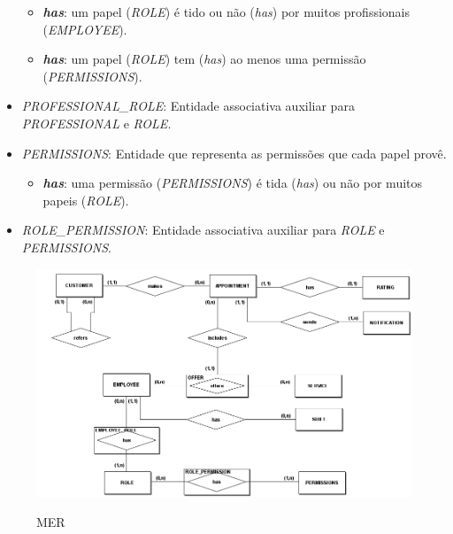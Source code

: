 \begin{itemize}
	\begin{itemize}
		\item \textbf{\textit{has}}: um papel (\emph{ROLE}) é tido ou não (\textit{has}) por muitos profissionais (\emph{EMPLOYEE}).
		\item \textbf{\textit{has}}: um papel (\emph{ROLE}) tem (\textit{has}) ao menos uma permissão (\emph{PERMISSIONS}).
	\end{itemize}
	\item \emph{PROFESSIONAL\_ROLE}: Entidade associativa auxiliar para \emph{PROFESSIONAL} e \emph{ROLE}.
	\item \emph{PERMISSIONS}: Entidade que representa as permissões que cada papel provê.
	\begin{itemize}
		\item \textbf{\textit{has}}: uma permissão (\emph{PERMISSIONS}) é tida (\textit{has}) ou não por muitos papeis (\emph{ROLE}).
\end{itemize}
	\item \emph{ROLE\_PERMISSION}: Entidade associativa auxiliar para \emph{ROLE} e \emph{PERMISSIONS}.
\end{itemize}
\begin{figure}[h!tbp]
	\centering
	\caption{MER}
	\includegraphics[width=1\textwidth]{cap04-desenvolvimento/images/4-7-1-modelo-entidade-relacionamento.png}
	\label{fig:mer}
\end{figure}
